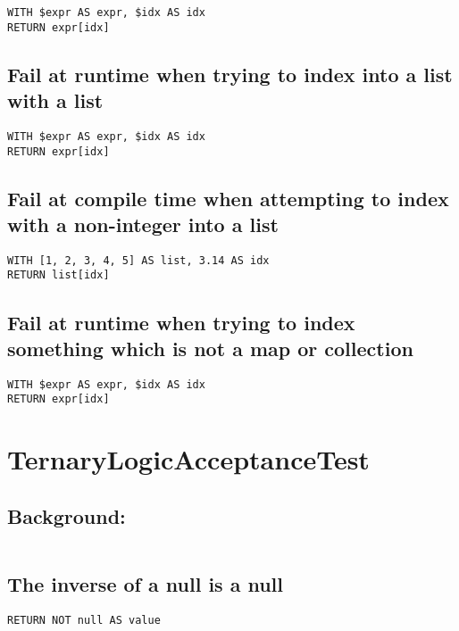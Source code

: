 \begin{lstlisting}
WITH $expr AS expr, $idx AS idx
RETURN expr[idx]
\end{lstlisting}

\subsection{Fail at runtime when trying to index into a list with a list}

\begin{lstlisting}
WITH $expr AS expr, $idx AS idx
RETURN expr[idx]
\end{lstlisting}

\subsection{Fail at compile time when attempting to index with a non-integer into a list}

\begin{lstlisting}
WITH [1, 2, 3, 4, 5] AS list, 3.14 AS idx
RETURN list[idx]
\end{lstlisting}

\subsection{Fail at runtime when trying to index something which is not a map or collection}

\begin{lstlisting}
WITH $expr AS expr, $idx AS idx
RETURN expr[idx]
\end{lstlisting}
\section{TernaryLogicAcceptanceTest}


\subsection{Background:}

\begin{lstlisting}
\end{lstlisting}

\subsection{The inverse of a null is a null}

\begin{lstlisting}
RETURN NOT null AS value
\end{lstlisting}

